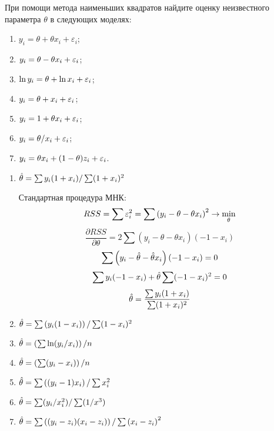 




\begin{problem} %
При помощи метода наименьших квадратов найдите оценку неизвестного параметра $\theta$ в следующих моделях:

\begin{enumerate}
\item $y_i = \theta + \theta x_i + \varepsilon_i$;
\item $y_i = \theta - \theta x_i + \varepsilon_i$;
\item $\ln y_i = \theta + \ln x_i + \varepsilon_i$;
\item $y_i = \theta + x_i + \varepsilon_i$;
\item $y_i = 1 + \theta x_i + \varepsilon_i$;
\item $y_i = \theta / x_i + \varepsilon_i$;
\item $y_i = \theta x_i + (1-\theta)z_i+\varepsilon_i$.
\end{enumerate}


\begin{sol}
\begin{enumerate}
\item \(\hat{\theta} = \sum y_i (1 + x_i) / \sum (1 + x_i)^2\)

Стандартная процедура МНК:
\[RSS = \sum \varepsilon_i^2 = \sum \left(y_i - \theta - \theta x_i\right)^2 \rightarrow \min \limits_\theta\]
\[\frac{\partial RSS}{\partial \theta} = 2 \sum \left(y_i - \theta - \theta x_i\right)(-1 - x_i) \]
\[\sum \left(y_i - \hat{\theta} - \hat{\theta} x_i\right)(-1 - x_i) = 0\]
\[\sum y_i (-1 - x_i) + \hat{\theta} \sum (-1 - x_i)^2 = 0 \]
\[\hat{\theta} = \frac{\sum y_i (1 + x_i)}{\sum (1 + x_i)^2} \]

\item \(\hat{\theta} = \sum \left(y_i (1 - x_i)\right) / \sum (1 - x_i)^2\)

\item \(\hat{\theta} = \left( \sum \text{ln} (y_i / x_i) \right) / n \)

\item \(\hat{\theta} = \left( \sum (y_i - x_i) \right) / n \)

\item \(\hat{\theta} = \sum \left((y_i - 1) x_i\right) / \sum x_i^2\)

\item \(\hat{\theta} = \sum (y_i / x_i^2) / \sum (1 /x^3)\)

\item \(\hat{\theta} = \sum \left((y_i - z_i)(x_i - z_i) \right) / \sum \left(x_i - z_i\right)^2 \)

\end{enumerate}
\end{sol}
\end{problem}


